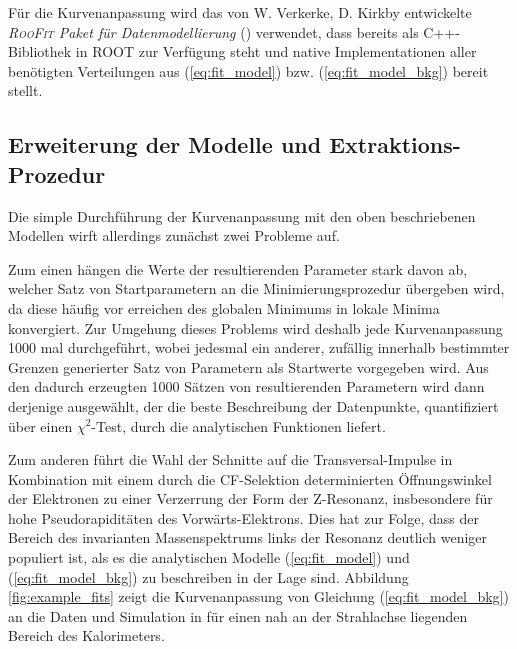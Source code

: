 Für die Kurvenanpassung wird das von W. Verkerke, D. Kirkby entwickelte
\textit{\textsc{RooFit} Paket für Datenmodellierung} (\cite{Verkerke:2003ir})
verwendet, dass bereits als \textsc{C++}-Bibliothek in \textsc{ROOT} zur
Verfügung steht und native Implementationen aller benötigten Verteilungen aus
(\ref{eq:fit_model}) bzw. (\ref{eq:fit_model_bkg}) bereit stellt.



\subsection{Erweiterung der Modelle und Extraktions-Prozedur}
\label{energy_calibration:erweiterung_der_modelle_und_prozedur}
Die simple Durchführung der Kurvenanpassung mit den oben beschriebenen Modellen
wirft allerdings zunächst zwei Probleme auf.

Zum einen hängen die Werte der resultierenden Parameter stark davon ab, welcher
Satz von Startparametern an die Minimierungsprozedur übergeben wird, da diese
häufig vor erreichen des globalen Minimums in lokale Minima konvergiert. Zur
Umgehung dieses Problems wird deshalb jede Kurvenanpassung 1000 mal
durchgeführt, wobei jedesmal ein anderer, zufällig innerhalb bestimmter Grenzen
generierter Satz von Parametern als Startwerte vorgegeben wird. Aus den dadurch
erzeugten 1000 Sätzen von resultierenden Parametern wird dann derjenige
ausgewählt, der die beste Beschreibung der Datenpunkte, quantifiziert über
einen $\chi^2$-Test, durch die analytischen Funktionen liefert.

Zum anderen führt die Wahl der Schnitte auf die Transversal-Impulse in
Kombination mit einem durch die \ac{CF}-Selektion determinierten Öffnungswinkel
der Elektronen zu einer Verzerrung der Form der Z-Resonanz, insbesondere für
hohe Pseudorapiditäten des Vorwärts-Elektrons. Dies hat zur Folge, dass der
Bereich des invarianten Massenspektrums links der Resonanz deutlich weniger
populiert ist, als es die analytischen Modelle (\ref{eq:fit_model}) und
(\ref{eq:fit_model_bkg}) zu beschreiben in der Lage sind. Abbildung
\ref{fig:example_fits} zeigt die Kurvenanpassung von Gleichung
(\ref{eq:fit_model_bkg}) an die Daten und Simulation in für einen nah an der
Strahlachse liegenden Bereich des Kalorimeters.

